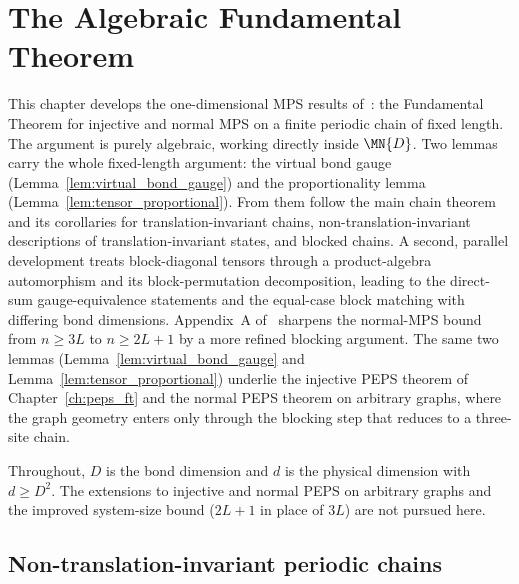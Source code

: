 
\chapter{The Algebraic Fundamental Theorem}%
\label{ch:algebraic_ft}

This chapter develops the one-dimensional MPS results
of~\cite{Molnar2018NormalPEPS}: the Fundamental Theorem for injective
and normal MPS on a finite periodic chain of fixed length.
The argument is purely algebraic, working directly inside $\MN{D}$.
Two lemmas carry the whole fixed-length argument: the virtual bond gauge
(Lemma~\ref{lem:virtual_bond_gauge}) and the proportionality lemma
(Lemma~\ref{lem:tensor_proportional}). From them follow the main chain
theorem and its corollaries for translation-invariant chains,
non-translation-invariant descriptions of translation-invariant states,
and blocked chains. A second, parallel development treats block-diagonal
tensors through a product-algebra automorphism and its block-permutation
decomposition, leading to the direct-sum gauge-equivalence statements and
the equal-case block matching with differing bond dimensions.
Appendix~A of~\cite{Molnar2018NormalPEPS} sharpens the normal-MPS bound from
$n \ge 3L$ to $n \ge 2L + 1$ by a more refined blocking argument. The same two
lemmas (Lemma~\ref{lem:virtual_bond_gauge} and
Lemma~\ref{lem:tensor_proportional}) underlie the injective PEPS theorem of
Chapter~\ref{ch:peps_ft} and the normal PEPS theorem on arbitrary graphs, where
the graph geometry enters only through the blocking step that reduces to a
three-site chain.

Throughout, $D$ is the bond dimension and $d$ is the physical dimension
with $d \ge D^2$.
The extensions to injective and normal PEPS on arbitrary graphs and the
improved system-size bound ($2L+1$ in place of $3L$) are not pursued here.

\section{Non-translation-invariant periodic chains}
\label{sec:non_ti_setup}


